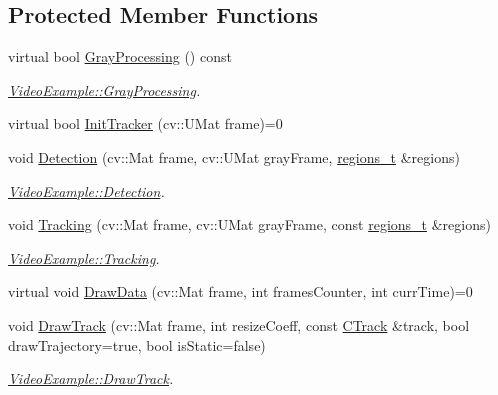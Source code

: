 \subsection*{Protected Member Functions}
\begin{DoxyCompactItemize}
\item 
virtual bool \mbox{\hyperlink{class_video_example_af8ea44f17711129d2b954d1f01fee1f0}{Gray\+Processing}} () const
\begin{DoxyCompactList}\small\item\em \mbox{\hyperlink{class_video_example_af8ea44f17711129d2b954d1f01fee1f0}{Video\+Example\+::\+Gray\+Processing}}. \end{DoxyCompactList}\item 
virtual bool \mbox{\hyperlink{class_video_example_a93e23d64075fb2f508423e45d15c5421}{Init\+Tracker}} (cv\+::\+U\+Mat frame)=0
\item 
void \mbox{\hyperlink{class_video_example_a5ea4a212997371399b01aed1d59a80b8}{Detection}} (cv\+::\+Mat frame, cv\+::\+U\+Mat gray\+Frame, \mbox{\hyperlink{defines_8h_a01db0de56a20f4342820a093c5154536}{regions\+\_\+t}} \&regions)
\begin{DoxyCompactList}\small\item\em \mbox{\hyperlink{class_video_example_a5ea4a212997371399b01aed1d59a80b8}{Video\+Example\+::\+Detection}}. \end{DoxyCompactList}\item 
void \mbox{\hyperlink{class_video_example_af412482dcaad532d958dc31b362ee1c2}{Tracking}} (cv\+::\+Mat frame, cv\+::\+U\+Mat gray\+Frame, const \mbox{\hyperlink{defines_8h_a01db0de56a20f4342820a093c5154536}{regions\+\_\+t}} \&regions)
\begin{DoxyCompactList}\small\item\em \mbox{\hyperlink{class_video_example_af412482dcaad532d958dc31b362ee1c2}{Video\+Example\+::\+Tracking}}. \end{DoxyCompactList}\item 
virtual void \mbox{\hyperlink{class_video_example_a53eb15977cb147dac218d8ea337986cd}{Draw\+Data}} (cv\+::\+Mat frame, int frames\+Counter, int curr\+Time)=0
\item 
void \mbox{\hyperlink{class_video_example_a84a040bc87b915c5ee18c5d11235f40c}{Draw\+Track}} (cv\+::\+Mat frame, int resize\+Coeff, const \mbox{\hyperlink{class_c_track}{C\+Track}} \&track, bool draw\+Trajectory=true, bool is\+Static=false)
\begin{DoxyCompactList}\small\item\em \mbox{\hyperlink{class_video_example_a84a040bc87b915c5ee18c5d11235f40c}{Video\+Example\+::\+Draw\+Track}}. \end{DoxyCompactList}\end{DoxyCompactItemize}
